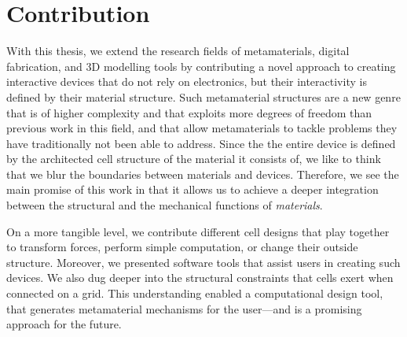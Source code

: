 \section{Contribution}

With this thesis, we extend the research fields of metamaterials, digital fabrication, and 3D modelling tools by contributing a novel approach to creating interactive devices that do not rely on electronics, but their interactivity is defined by their material structure. Such metamaterial structures are a new genre that is of higher complexity and that exploits more degrees of freedom than previous work in this field, and that allow metamaterials to tackle problems they have traditionally not been able to address. Since the the entire device is defined by the architected cell structure of the material it consists of, we like to think that we blur the boundaries between materials and devices. Therefore, we see the main promise of this work in that it allows us to achieve a deeper integration between the structural and the mechanical functions of \textit{materials}.

On a more tangible level, we contribute different cell designs that play together to transform forces, perform simple computation, or change their outside structure. Moreover, we presented software tools that assist users in creating such devices. We also dug deeper into the structural constraints that cells exert when connected on a grid. This understanding enabled a computational design tool, that generates metamaterial mechanisms for the user---and is a promising approach for the future.






